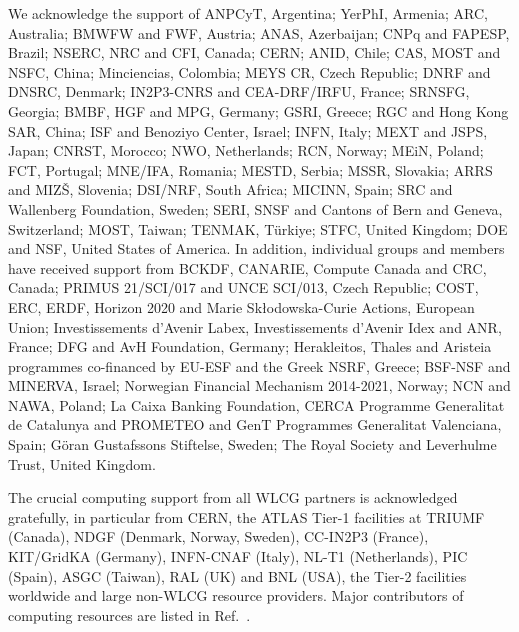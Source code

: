 \documentclass[cernpreprint, atlasdraft=false, UKenglish,british,orcidlogo, texmf, orcidlogo]{atlasdoc}
\begin{document}
We acknowledge the support of
ANPCyT, Argentina;
YerPhI, Armenia;
ARC, Australia;
BMWFW and FWF, Austria;
ANAS, Azerbaijan;
CNPq and FAPESP, Brazil;
NSERC, NRC and CFI, Canada;
CERN;
ANID, Chile;
CAS, MOST and NSFC, China;
Minciencias, Colombia;
MEYS CR, Czech Republic;
DNRF and DNSRC, Denmark;
IN2P3-CNRS and CEA-DRF/IRFU, France;
SRNSFG, Georgia;
BMBF, HGF and MPG, Germany;
GSRI, Greece;
RGC and Hong Kong SAR, China;
ISF and Benoziyo Center, Israel;
INFN, Italy;
MEXT and JSPS, Japan;
CNRST, Morocco;
NWO, Netherlands;
RCN, Norway;
MEiN, Poland;
FCT, Portugal;
MNE/IFA, Romania;
MESTD, Serbia;
MSSR, Slovakia;
ARRS and MIZ\v{S}, Slovenia;
DSI/NRF, South Africa;
MICINN, Spain;
SRC and Wallenberg Foundation, Sweden;
SERI, SNSF and Cantons of Bern and Geneva, Switzerland;
MOST, Taiwan;
TENMAK, T\"urkiye;
STFC, United Kingdom;
DOE and NSF, United States of America.
In addition, individual groups and members have received support from
BCKDF, CANARIE, Compute Canada and CRC, Canada;
PRIMUS 21/SCI/017 and UNCE SCI/013, Czech Republic;
COST, ERC, ERDF, Horizon 2020 and Marie Sk{\l}odowska-Curie Actions, European Union;
Investissements d'Avenir Labex, Investissements d'Avenir Idex and ANR, France;
DFG and AvH Foundation, Germany;
Herakleitos, Thales and Aristeia programmes co-financed by EU-ESF and the Greek NSRF, Greece;
BSF-NSF and MINERVA, Israel;
Norwegian Financial Mechanism 2014-2021, Norway;
NCN and NAWA, Poland;
La Caixa Banking Foundation, CERCA Programme Generalitat de Catalunya and PROMETEO and GenT Programmes Generalitat Valenciana, Spain;
G\"{o}ran Gustafssons Stiftelse, Sweden;
The Royal Society and Leverhulme Trust, United Kingdom.
 
The crucial computing support from all WLCG partners is acknowledged gratefully, in particular from CERN, the ATLAS Tier-1 facilities at TRIUMF (Canada), NDGF (Denmark, Norway, Sweden), CC-IN2P3 (France), KIT/GridKA (Germany), INFN-CNAF (Italy), NL-T1 (Netherlands), PIC (Spain), ASGC (Taiwan), RAL (UK) and BNL (USA), the Tier-2 facilities worldwide and large non-WLCG resource providers. Major contributors of computing resources are listed in Ref.~\cite{ATL-SOFT-PUB-2021-003}.
 


 
 
 
 
\appendix
{}
{}
\printnoidxglossaries
 
{}
\printbibliography
 
 
 
\clearpage
 

 
\end{document}

